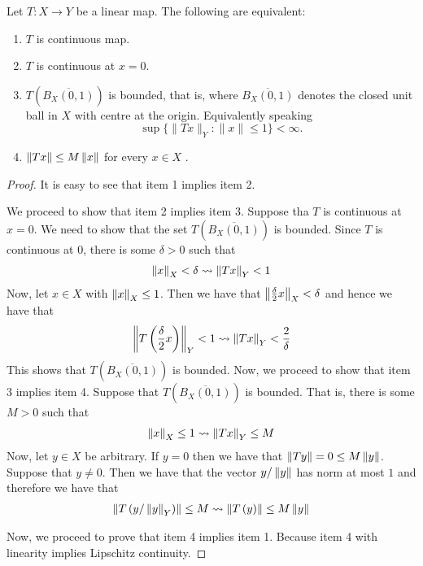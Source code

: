 \begin{proposition}
    Let $T: X\to Y$ be a linear map. The following are equivalent:
    \begin{enumerate}
	\item $T$ is continuous map.
	\item $T$ is continuous at $x=0$.
	\item $T\left( \overline{B_{X}\left( 0,1 \right)} \right)$ is bounded, that is, where $\overline{B_X(0,1)}$ denotes the closed unit ball in $X$ with centre at the origin. Equivalently speaking $$\sup \{ \|Tx\|_Y : \|x\| \leqslant 1\} < \infty.$$
	\item $\left\lVert Tx \right\rVert \le M \left\lVert x \right\rVert$ for every $x\in X$ .
    \end{enumerate}
    \label{prop:equiv-lin-maps}
\end{proposition}
\begin{proof}
    It is easy to see that item 1 implies item 2. 

    We proceed to show that item 2 implies item 3. Suppose tha $T$ is continuous at $x=0$. We need to show that the set $T\left( \overline{B_{X}\left( 0,1 \right)} \right)$ is bounded. Since $T$ is continuous at $0$, there is some $\delta > 0$ such that 
    \begin{align*}
	\left\lVert x \right\rVert_{X} < \delta \leadsto \left\lVert Tx \right\rVert_{Y} < 1
    \end{align*}
    Now, let $x\in X$ with $\left\lVert x \right\rVert_{X} \le 1$. Then we have that $\left\lVert \frac{\delta}{2}x \right\rVert_{X}<\delta$ and hence we have that
    \begin{align*}
	\left\lVert T\left( \frac{\delta}{2} x \right) \right\rVert_{Y} <1 \leadsto \left\lVert Tx \right\rVert_{Y} < \frac{2}{\delta}
    \end{align*}
    This shows that $T\left( \overline{B_{X} \left( 0,1 \right) } \right)$ is bounded.
    Now, we proceed to show that item 3 implies item 4. Suppose that $T\left( \overline{B_{X} \left( 0,1 \right) } \right)$ is bounded. That is, there is some $M > 0$ such that
    \begin{align*}
	\left\lVert x \right\rVert_{X} \le 1 \leadsto \left\lVert Tx \right\rVert_{Y} \le M
    \end{align*}
    Now, let $y\in X$ be arbitrary. If $y=0$ then we have that $\left\lVert Ty \right\rVert = 0 \le M \left\lVert y \right\rVert$. Suppose that $y\ne 0$. Then we have that the vector $y/\left\lVert y \right\rVert$ has norm at most $1$ and therefore we have that 
    \begin{align*}
	\left\lVert T\left( y/\left\lVert y \right\rVert_{Y} \right) \right\rVert \le M \leadsto \left\lVert T \left( y \right) \right\rVert \le M \left\lVert y \right\rVert
    \end{align*}
    
    Now, we proceed to prove that item 4 implies item 1. Because item 4 with linearity implies Lipschitz continuity.
\end{proof}

